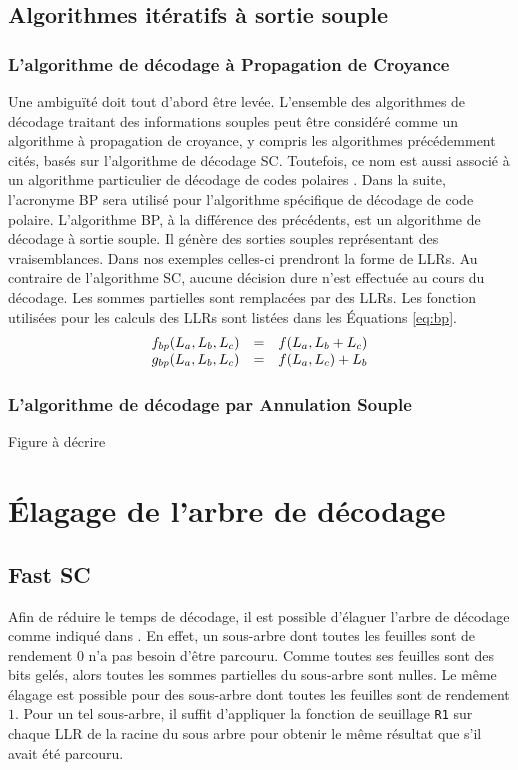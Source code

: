 \subsection{Algorithmes itératifs à sortie souple}


\subsubsection{L'algorithme de décodage à Propagation de Croyance}
Une ambiguïté doit tout d'abord être levée. L'ensemble des algorithmes de décodage traitant des informations souples peut être considéré comme un algorithme à propagation de croyance, y compris les algorithmes précédemment cités, basés sur l'algorithme de décodage SC. Toutefois, ce nom est aussi associé à un algorithme particulier de décodage de codes polaires \cite{arikan_channel_2009}. Dans la suite, l'acronyme BP sera utilisé pour l'algorithme spécifique de décodage de code polaire. L'algorithme BP, à la différence des précédents, est un algorithme de décodage à sortie souple. Il génère des sorties souples représentant des vraisemblances. Dans nos exemples celles-ci prendront la forme de LLRs. Au contraire de l'algorithme SC, aucune décision dure n'est effectuée au cours du décodage. Les sommes partielles sont remplacées par des LLRs. Les fonction utilisées pour les calculs des LLRs sont listées dans les Équations \ref{eq:bp}.
    \begin{eqnarray}
      \begin{array}{l c l}
        f_{bp}(L_a,L_b,L_c) &=& f(L_a, L_b + L_c) \\
        g_{bp}(L_a,L_b,L_c)&=& f(L_a, L_c) + L_b
      \end{array}
      \label{eq:bp}
    \end{eqnarray}

\subsubsection{L'algorithme de décodage par Annulation Souple}
Figure à décrire

\section{Élagage de l'arbre de décodage}


\subsection{Fast SC}
Afin de réduire le temps de décodage, il est possible d'élaguer l'arbre de décodage comme indiqué dans \cite{alamdar-yazdi_simplified_2011}. En effet, un sous-arbre dont toutes les feuilles sont de rendement $0$ n'a pas besoin d'être parcouru. Comme toutes ses feuilles sont des bits gelés, alors toutes les sommes partielles du sous-arbre sont nulles. Le même élagage est possible pour des sous-arbre dont toutes les feuilles sont de rendement $1$. Pour un tel sous-arbre, il suffit d'appliquer la fonction de seuillage \texttt{R1} sur chaque LLR de la racine du sous arbre pour obtenir le même résultat que s'il avait été parcouru.

